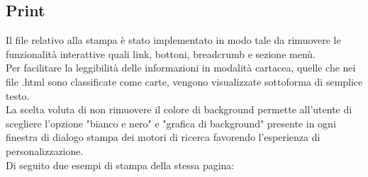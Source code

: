 \documentclass[]{article}
\begin{document}
\subsection{Print}
Il file relativo alla stampa è stato implementato in modo tale da rimuovere le funzionalità interattive quali link, bottoni, breadcrumb e sezione menù.\\
Per facilitare la leggibilità delle informazioni in modalità cartacea, quelle che nei file .html sono classificate come carte, vengono visualizzate sottoforma di semplice testo.\\
La scelta voluta di non rimuovere il colore di background permette all'utente di scegliere l'opzione "bianco e nero" e "grafica di background" presente in ogni finestra di dialogo stampa dei motori di ricerca favorendo l'esperienza di personalizzazione.\\
Di seguito due  esempi di stampa della stessa pagina:
\end{document}
